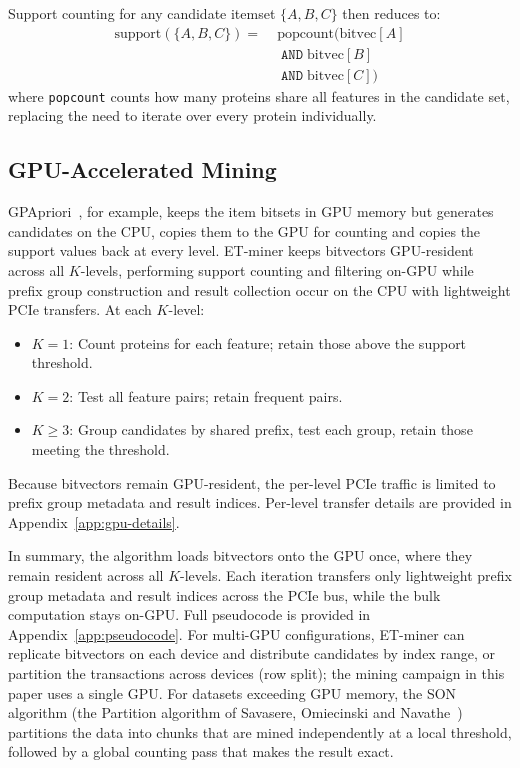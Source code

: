 \documentclass[10pt,a4paper,twocolumn]{article}
\begin{document}
Support counting for any candidate itemset $\{A, B, C\}$ then reduces to:
\begin{align*}
    \text{support}(\{A, B, C\}) = \;&\text{popcount}(\text{bitvec}[A] \\
    &\;\texttt{AND}\; \text{bitvec}[B] \\
    &\;\texttt{AND}\; \text{bitvec}[C])
\end{align*}
where \texttt{popcount} counts how many proteins share all features in the candidate set, replacing the need to iterate over every protein individually.

\subsection{GPU-Accelerated Mining}

GPApriori~\cite{zhang2011}, for example, keeps the item bitsets in GPU memory but generates candidates on the CPU, copies them to the GPU for counting and copies the support values back at every level. ET-miner keeps bitvectors GPU-resident across all $K$-levels, performing support counting and filtering on-GPU while prefix group construction and result collection occur on the CPU with lightweight PCIe transfers. At each $K$-level:

\begin{itemize}[leftmargin=*]
    \item $K{=}1$: Count proteins for each feature; retain those above the
          support threshold.
    \item $K{=}2$: Test all feature pairs; retain frequent pairs.
    \item $K{\geq}3$: Group candidates by shared prefix, test each group,
          retain those meeting the threshold.
\end{itemize}

Because bitvectors remain GPU-resident, the per-level PCIe traffic is limited to prefix group metadata and result indices. Per-level transfer details
are provided in Appendix~\ref{app:gpu-details}.

\noindent In summary, the algorithm loads bitvectors onto the GPU once, where they remain resident across all $K$-levels. Each iteration transfers only lightweight prefix group metadata and result indices across the PCIe bus, while the bulk computation stays on-GPU. Full pseudocode is provided in Appendix~\ref{app:pseudocode}. For multi-GPU configurations, ET-miner can replicate bitvectors on each device and distribute candidates by index range, or partition the transactions across devices (row split); the mining campaign in this paper uses a single GPU. For datasets exceeding GPU memory, the SON algorithm (the Partition algorithm of Savasere, Omiecinski and Navathe~\cite{savasere1995}) partitions the data into chunks that are mined independently at a local threshold, followed by a global counting pass that makes the result exact.
\end{document}
